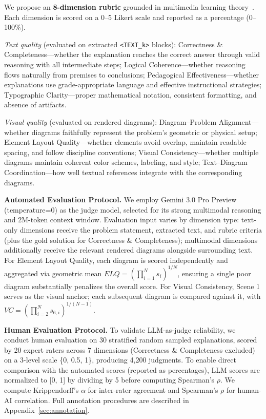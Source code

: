 \documentclass[11pt]{article}
\begin{document}
We propose an \textbf{8-dimension rubric} grounded in multimedia learning theory~\citep{sweller1988cognitive,paivio1971imagery,mayer2001multimedia}. Each dimension is scored on a 0--5 Likert scale and reported as a percentage (0--100\%).

\textit{Text quality} (evaluated on extracted \texttt{<TEXT\_k>} blocks): Correctness \& Completeness---whether the explanation reaches the correct answer through valid reasoning with all intermediate steps; Logical Coherence---whether reasoning flows naturally from premises to conclusions; Pedagogical Effectiveness---whether explanations use grade-appropriate language and effective instructional strategies; Typographic Clarity---proper mathematical notation, consistent formatting, and absence of artifacts.

\textit{Visual quality} (evaluated on rendered diagrams): Diagram--Problem Alignment---whether diagrams faithfully represent the problem's geometric or physical setup; Element Layout Quality---whether elements avoid overlap, maintain readable spacing, and follow discipline conventions; Visual Consistency---whether multiple diagrams maintain coherent color schemes, labeling, and style; Text--Diagram Coordination---how well textual references integrate with the corresponding diagrams.

\textbf{Automated Evaluation Protocol.} We employ Gemini 3.0 Pro Preview (temperature=0) as the judge model, selected for its strong multimodal reasoning and 2M-token context window. Evaluation input varies by dimension type: text-only dimensions receive the problem statement, extracted text, and rubric criteria (plus the gold solution for Correctness \& Completeness); multimodal dimensions additionally receive the relevant rendered diagrams alongside surrounding text. For Element Layout Quality, each diagram is scored independently and aggregated via geometric mean $ELQ = \left(\prod_{i=1}^N s_i\right)^{1/N}$, ensuring a single poor diagram substantially penalizes the overall score. For Visual Consistency, Scene 1 serves as the visual anchor; each subsequent diagram is compared against it, with $VC = \left(\prod_{i=2}^N s_{6,i}\right)^{1/(N-1)}$.

\textbf{Human Evaluation Protocol.} To validate LLM-as-judge reliability, we conduct human evaluation on 30 stratified random sampled explanations, scored by 20 expert raters across 7 dimensions (Correctness \& Completeness excluded) on a 3-level scale \{0, 0.5, 1\}, producing 4,200 judgments. To enable direct comparison with the automated scores (reported as percentages), LLM scores are normalized to [0, 1] by dividing by 5 before computing Spearman's $\rho$. We compute Krippendorff's $\alpha$ for inter-rater agreement and Spearman's $\rho$ for human-AI correlation. Full annotation procedures are described in Appendix~\ref{sec:annotation}.
\end{document}
